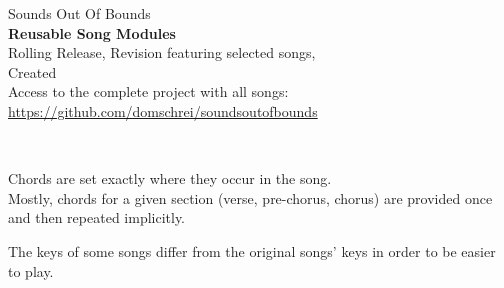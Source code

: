 
\vspace*{6cm} 
{\Large Sounds Out Of Bounds}\\
\textbf{Reusable Song Modules}\\

Rolling Release, Revision %
featuring selected songs,\\
Created %
\ \\

Access to the complete project with all songs:\\
\url{https://github.com/domschrei/soundsoutofbounds}

\ \\[1cm]



Chords are set exactly where they occur in the song.\\

Mostly, chords for a given section (verse, pre-chorus, chorus) are provided once and then repeated implicitly.

The keys of some songs differ from the original songs' keys in order to be easier to play.

\pagebreak 